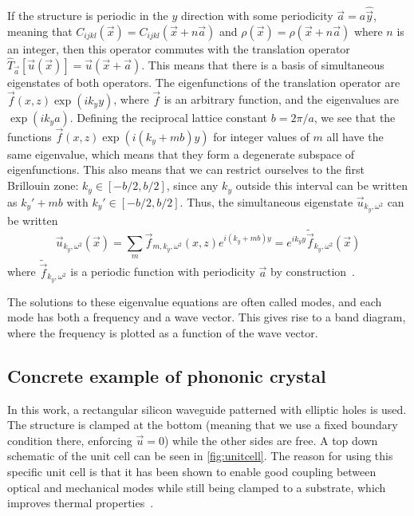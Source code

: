 If the structure is periodic in the $y$ direction with some periodicity
$\vec a = a \hat{\vec y}$,
meaning that $C_{ijkl}(\vec x) = C_{ijkl}(\vec x + n \vec a)$ and $\rho(\vec x)
= \rho(\vec x + n \vec a)$ where $n$ is an
integer, then this operator commutes with the translation operator
$\hat T_{\vec a}[\vec u(\vec x)] = \vec u(\vec x + \vec a)$.
This means that there is a basis of simultaneous eigenstates of both operators.
The eigenfunctions of the translation operator are
$\vec f(x, z)\exp(i k_y y)$, where $\vec f$ is an arbitrary function,
and the eigenvalues are $\exp(i k_y a)$.
Defining the reciprocal lattice constant $b = 2 \pi / a$, we see
that the functions $\vec f(x, z) \exp(i (k_y + m b) y)$ for integer values
of $m$ all have the same eigenvalue, which means that they form a degenerate
subspace of eigenfunctions.
This also means that we can restrict ourselves to the first Brillouin zone:
$k_y \in [-b/2, b/2]$,
since any $k_y$ outside this interval can be written as $k_y' + mb$ with
$k_y' \in [-b/2, b/2]$.
Thus, the simultaneous eigenstate $\vec u_{k_y, \omega^2}$ can be written
\begin{equation}
	\vec u_{k_y, \omega^2}(\vec x) = \sum_m \vec f_{m,k_y,\omega^2}(x, z) e^{i (k_y + m b) y}
	= e^{i k_y y} \tilde{\vec f}_{k_y, \omega^2}(\vec x)
\end{equation}
where $\tilde{\vec f}_{k_y, \omega^2}$ is a periodic function with periodicity
$\vec a$ by construction~\cite{joannopoulos2008photonic}.

The solutions to these eigenvalue equations are often called modes, and each
mode has both a frequency and a wave vector. This gives rise to a band diagram,
where the frequency is plotted as a function of the wave vector.

\subsection{Concrete example of phononic crystal}

In this work, a rectangular silicon waveguide patterned with elliptic holes is used.
The structure is clamped at the bottom (meaning that we use a fixed boundary
condition there, enforcing $\vec u = 0$) while the other sides are free.
A top down schematic of the unit cell can be seen in \cref{fig:unitcell}.
The reason for using this specific unit cell is that it has been shown to
enable good coupling between optical and mechanical modes while still being
clamped to a substrate, which improves thermal
properties~\cite{kolvik_clamped_2023}.

